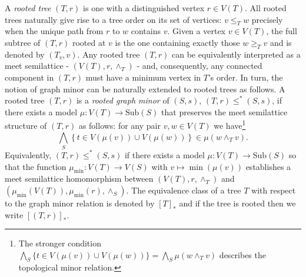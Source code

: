 \documentclass[12pt]{amsart}
\numberwithin{mytheorem}{section} %
\numberwithin{mylemma}{section} %
\numberwithin{mycorollary}{section} %
\newcommand{\cc}{\mathfrak{c}}
\begin{document}
A {\it rooted tree} $(T,r)$ is one with a distinguished vertex $r\in V(T)$. All rooted trees naturally give rise to a tree order on its set of vertices: $v\leq_T w$ precisely when the unique path from $r$ to $w$ contains $v$. Given a vertex $v\in V(T)$, the full subtree of $(T,r)$ rooted at $v$ is the one containing exactly those $w\geq_T v$ and is denoted by $(T_v,v)$. Any rooted tree $(T,r)$ can be equivalently interpreted as a meet semilattice - $(V(T),r,\wedge_T)$ - and, consequently, any connected component in $(T,r)$ must have a minimum vertex in $T$'s order. In turn, the notion of graph minor can be naturally extended to rooted trees as follows. A rooted tree $(T,r)$ is a {\it rooted graph minor} of $(S,s)$, $(T,r) \leq^*(S,s)$, if there exists a model $\mu:V(T) \to \text{Sub}(S)$ that preserves the meet semilattice structure of $(T,r)$ as follows: for any pair $v,w\in V(T)$ we have\footnote{The stronger condition $\bigwedge_S\{t\in V(\mu(v)) \cup V(\mu(w))\}= \bigwedge_S\mu(w\wedge_T v)$ describes the topological minor relation.}  
\[
\bigwedge_S\left\{t\in V(\mu(v)) \cup V(\mu(w))\right\} \in \mu(w\wedge_T v).
\]
Equivalently, $(T,r) \leq^*(S,s)$ if there exists a model $\mu:V(T) \to \text{Sub}(S)$ so that the function $\mu_{\min}:V(T) \to V(S)$ with $v \mapsto \min(\mu(v))$ establishes a meet semilattice homomorphism between $(V(T), r, \wedge_T)$ and $(\mu_{\min}(V(T)), \mu_{\min}(r), \wedge_S)$. The equivalence class of a tree $T$ with respect to the graph minor relation is denoted by $[T]_*$ and if the tree is rooted then we write $[(T,r)]_*$.


\end{document}
